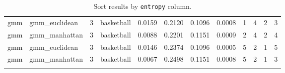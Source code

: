 \begin{itemize}
{\begin{longtable}{| p{1cm} | p{1.8cm} | p{0.7cm} | p{0.9cm} | p{0.5cm} | p{0.65cm} | p{0.5cm} | p{0.5cm} | p{0.55cm} | p{0.55cm} | p{0.6cm} | p{0.5cm} |}
\cline{2-12}
\scriptsize      gmm     & \scriptsize  gmm\_euclidean & \scriptsize    3     & \scriptsize basketball & \scriptsize    0.0159    & \scriptsize 0.2120  & \scriptsize 0.1096 & \scriptsize    0.0008    & \scriptsize        1         & \scriptsize     4       & \scriptsize      2    & \scriptsize        3 \\
\cline{2-12}
\scriptsize      gmm     & \scriptsize  gmm\_manhattan & \scriptsize    3     & \scriptsize basketball & \scriptsize    0.0088    & \scriptsize 0.2201  & \scriptsize 0.1151 & \scriptsize    0.0009    & \scriptsize        2         & \scriptsize     4       & \scriptsize      2    & \scriptsize        4 \\
\cline{2-12}
\scriptsize      gmm     & \scriptsize  gmm\_euclidean & \scriptsize    3     & \scriptsize basketball & \scriptsize    0.0146    & \scriptsize 0.2374  & \scriptsize 0.1096 & \scriptsize    0.0005    & \scriptsize        5         & \scriptsize     2       & \scriptsize      1    & \scriptsize        5 \\
\cline{2-12}
\scriptsize      gmm     & \scriptsize  gmm\_manhattan & \scriptsize    3     & \scriptsize basketball & \scriptsize    0.0067    & \scriptsize 0.2498  & \scriptsize 0.1151 & \scriptsize    0.0008    & \scriptsize        5         & \scriptsize     2       & \scriptsize      1    & \scriptsize        3 \\
\hline
\caption{Sort results by \texttt{entropy} column.}
\label{tab:resultsorting}
\end{longtable}}


\end{itemize}
